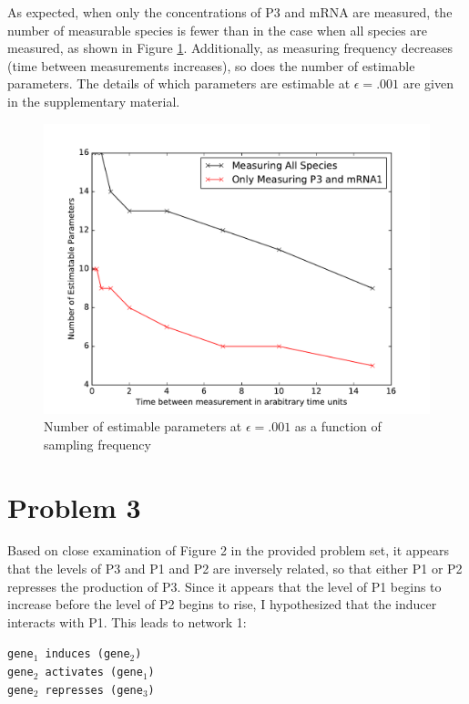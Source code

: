 \documentclass{article}
\begin{document}
As expected, when only the concentrations of P3 and mRNA are measured, the number of measurable species is fewer than in the case when all species are measured, as shown in Figure \ref{fig:P2Freq}. Additionally, as measuring frequency decreases (time between measurements increases), so does the number of estimable parameters. The details of which parameters are estimable at $\epsilon = .001$ are given in the  supplementary material.
\begin{figure}[h!]
\includegraphics[width=12cm]{../ThreeGeneRachelV2/figures/NumberOfEstamatableParamsAsAFunctionOfFreq}
\caption{Number of estimable parameters at $\epsilon =.001$ as a function of sampling frequency}
\label{fig:P2Freq}
\end{figure}



\section*{Problem 3} 
Based on close examination of Figure 2 in the provided problem set, it appears that the levels of P3 and P1 and P2 are inversely related, so that either P1 or P2 represses the production of P3. Since it appears that the level of P1 begins to increase before the level of P2 begins to rise, I hypothesized that the inducer interacts with P1. This leads to network 1:\\

\begin{centering}
\texttt{gene$_1$ induces (gene$_2$)\\
gene$_2$ activates (gene$_1$) \\
gene$_2$ represses (gene$_3$)}\\
\end{centering}
\end{document}

